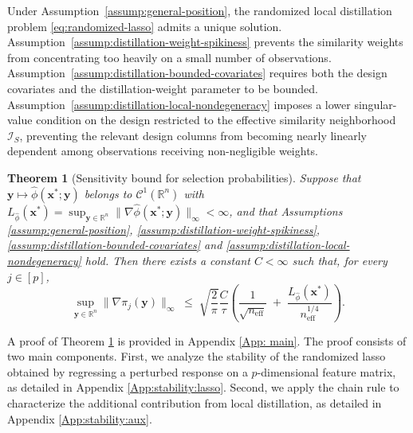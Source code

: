 \documentclass[12pt]{article}
\newcommand{\R}{\mathbb{R}}
\newcommand{\neff}{n_{\mathrm{eff}}}
\newtheorem{theorem}{Theorem}
\theoremstyle{definition}
\begin{document}
Under Assumption~\ref{assump:general-position}, the randomized local distillation problem \eqref{eq:randomized-lasso} admits a unique solution.
Assumption~\ref{assump:distillation-weight-spikiness} prevents the similarity weights from concentrating too heavily on a small number of observations. Assumption~\ref{assump:distillation-bounded-covariates} requires both the design covariates and the distillation-weight parameter to be bounded. Assumption~\ref{assump:distillation-local-nondegeneracy} imposes a lower singular-value condition on the design restricted to the effective similarity neighborhood $\mathcal I_S$, preventing the relevant design columns from becoming nearly linearly dependent among observations receiving non-negligible weights.


\begin{theorem}[Sensitivity bound for selection probabilities]
\label{thm:stability}
Suppose that $\bm y\mapsto\hat\phi(\bm{x}^*; \bm{y})$ belongs to $\mathcal{C}^1(\R^n)$ with $L_{\hat\phi}(\bm{x}^*) = \sup_{\bm{y}\in \R^n} \|\nabla \hat\phi(\bm{x}^*; \bm{y})\|_{\infty}<\infty$, and that Assumptions \ref{assump:general-position}, \ref{assump:distillation-weight-spikiness}, \ref{assump:distillation-bounded-covariates} and \ref{assump:distillation-local-nondegeneracy} hold.
Then there exists a constant $C<\infty$ such that, for every $j\in[p]$, 
\begin{equation*}
  \sup_{\bm{y}\in \R^n} \|\nabla \pi_j(\bm{y})\|_{\infty}
  \;\le\;
  \sqrt{\frac{2}{\pi}}\frac{C}{\tau}
  \left(\frac{1}{\sqrt{\neff}}
    \;+\; \frac{L_{\hat\phi}(\bm{x}^*)}{\neff^{1/4}}\right).
\end{equation*}
\end{theorem}

A proof of Theorem \ref{thm:stability} is provided in Appendix \ref{App: main}.
The proof consists of two main components. 
First, we analyze the stability of the randomized lasso obtained by regressing a perturbed response on a $p$-dimensional feature matrix, as detailed in Appendix \ref{App:stability:lasso}. 
Second, we apply the chain rule to characterize the additional contribution from local distillation, as detailed in Appendix \ref{App:stability:aux}.
\end{document}
